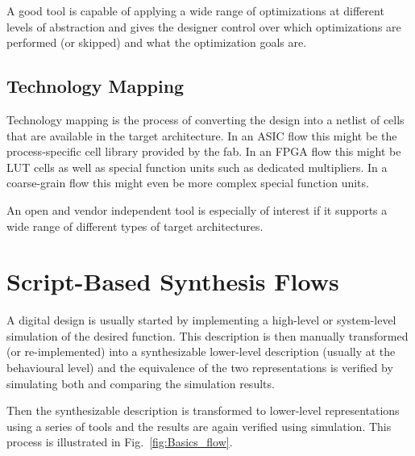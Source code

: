 A good tool is capable of applying a wide range of optimizations at different
levels of abstraction and gives the designer control over which optimizations
are performed (or skipped) and what the optimization goals are.

\subsection{Technology Mapping}

Technology mapping is the process of converting the design into a netlist of
cells that are available in the target architecture. In an ASIC flow this might
be the process-specific cell library provided by the fab. In an FPGA flow this
might be LUT cells as well as special function units such as dedicated multipliers.
In a coarse-grain flow this might even be more complex special function units.

An open and vendor independent tool is especially of interest if it supports
a wide range of different types of target architectures.

\section{Script-Based Synthesis Flows}

A digital design is usually started by implementing a high-level or
system-level simulation of the desired function. This description is then
manually transformed (or re-implemented) into a synthesizable lower-level
description (usually at the behavioural level) and the equivalence of the
two representations is verified by simulating both and comparing the simulation
results.

Then the synthesizable description is transformed to lower-level
representations using a series of tools and the results are again verified
using simulation. This process is illustrated in Fig.~\ref{fig:Basics_flow}.

